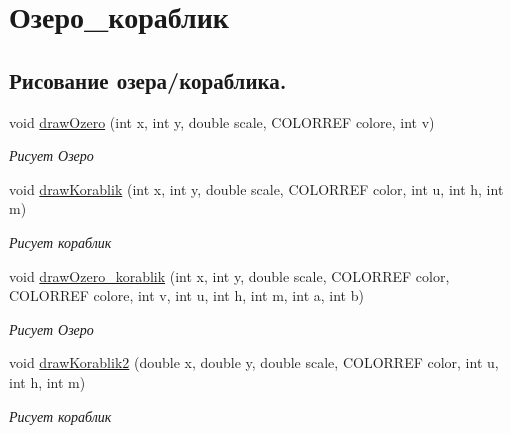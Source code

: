 \hypertarget{group___xD0_x9E_xD0_xB7_xD0_xB5_xD1_x80_xD0_xBE___xD0_xBA_xD0_xBE_xD1_x80_xD0_xB0_xD0_xB1_xD0_xBB_xD0_xB8_xD0_xBA}{}\section{Озеро\+\_\+кораблик}
\label{group___xD0_x9E_xD0_xB7_xD0_xB5_xD1_x80_xD0_xBE___xD0_xBA_xD0_xBE_xD1_x80_xD0_xB0_xD0_xB1_xD0_xBB_xD0_xB8_xD0_xBA}
\subsection*{Рисование озера/кораблика.}
\begin{DoxyCompactItemize}
\item 
void \hyperlink{group___xD0_x9E_xD0_xB7_xD0_xB5_xD1_x80_xD0_xBE___xD0_xBA_xD0_xBE_xD1_x80_xD0_xB0_xD0_xB1_xD0_xBB_xD0_xB8_xD0_xBA_gac283b8271de77e2bbfeef40a0ed29e33}{draw\+Ozero} (int x, int y, double scale, C\+O\+L\+O\+R\+R\+EF colore, int v)
\begin{DoxyCompactList}\small\item\em Рисует Озеро \end{DoxyCompactList}\item 
void \hyperlink{group___xD0_x9E_xD0_xB7_xD0_xB5_xD1_x80_xD0_xBE___xD0_xBA_xD0_xBE_xD1_x80_xD0_xB0_xD0_xB1_xD0_xBB_xD0_xB8_xD0_xBA_gaa5f04a811e13c12ff31d58f8ee9b25cf}{draw\+Korablik} (int x, int y, double scale, C\+O\+L\+O\+R\+R\+EF color, int u, int h, int m)
\begin{DoxyCompactList}\small\item\em Рисует кораблик \end{DoxyCompactList}\item 
void \hyperlink{group___xD0_x9E_xD0_xB7_xD0_xB5_xD1_x80_xD0_xBE___xD0_xBA_xD0_xBE_xD1_x80_xD0_xB0_xD0_xB1_xD0_xBB_xD0_xB8_xD0_xBA_gab7ad07d31533ef74695b09102d8aea3e}{draw\+Ozero\+\_\+korablik} (int x, int y, double scale, C\+O\+L\+O\+R\+R\+EF color, C\+O\+L\+O\+R\+R\+EF colore, int v, int u, int h, int m, int a, int b)
\begin{DoxyCompactList}\small\item\em Рисует Озеро \end{DoxyCompactList}\item 
void \hyperlink{group___xD0_x9E_xD0_xB7_xD0_xB5_xD1_x80_xD0_xBE___xD0_xBA_xD0_xBE_xD1_x80_xD0_xB0_xD0_xB1_xD0_xBB_xD0_xB8_xD0_xBA_ga1c7d6435fddca717803b799dfa544609}{draw\+Korablik2} (double x, double y, double scale, C\+O\+L\+O\+R\+R\+EF color, int u, int h, int m)
\begin{DoxyCompactList}\small\item\em Рисует кораблик \end{DoxyCompactList}\end{DoxyCompactItemize}



